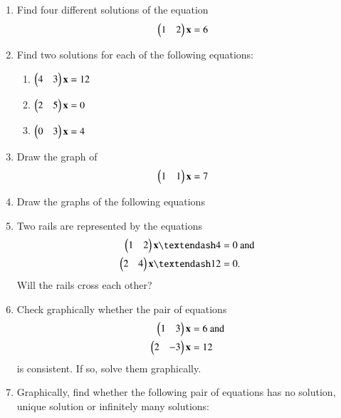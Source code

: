 \begin{enumerate}[label=\arabic*.,ref=\thesubsection.\theenumi]
\item Find four different solutions of the equation 
%
\begin{align}
\begin{pmatrix}1 & 2\end{pmatrix}\mathbf{x} &= 6
\end{align}
%
\item Find two solutions for each of the following equations: 
\begin{enumerate}
\item $\begin{pmatrix}4 & 3\end{pmatrix}\mathbf{x} = 12$
\item $\begin{pmatrix} 2 & 5\end{pmatrix}\mathbf{x}  = 0 $
\item $\begin{pmatrix} 0 & 3\end{pmatrix}\mathbf{x}  = 4$
\end{enumerate}
%
\item Draw the graph of 
%
\begin{align}
\begin{pmatrix}1 & 1\end{pmatrix}\mathbf{x} &= 7
\end{align}
%
\item Draw the graphs of the following equations
\begin{enumerate}[itemsep=2pt]
\end{enumerate}
%
\item Two rails are represented by the equations 
\begin{align}
\myvec{1 & 2}\vec{x} – 4 &= 0 \text{ and}
\\
\myvec{ 2 & 4}\vec{x} – 12 &= 0. 
\end{align}
%
Will the rails cross each other?
%
\item Check graphically whether the pair of equations 
\begin{align}
\begin{pmatrix}1 & 3\end{pmatrix}\mathbf{x}  &= 6 \text{ and}
\\
\begin{pmatrix} 2 & -3\end{pmatrix}\mathbf{x} &= 12 
\end{align}
%
is consistent. If so, solve them graphically.
%
\item Graphically, find whether the following pair of equations has no solution, unique solution or infinitely many solutions: 
%
\begin{align}

\end{align}
\end{enumerate}
